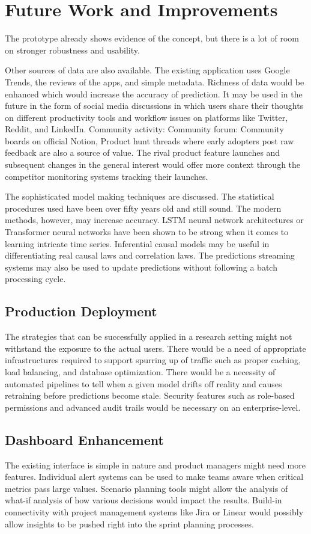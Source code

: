 \section{Future Work and Improvements}

The prototype already shows evidence of the concept, but there is a lot of room on stronger robustness and usability.

Other sources of data are also available.
The existing application uses Google Trends, the reviews of the apps, and simple metadata. Richness of data would be enhanced which would increase the accuracy of prediction. It may be used in the future in the form of social media discussions in which users share their thoughts on different productivity tools and workflow issues on platforms like Twitter, Reddit, and LinkedIn. Community activity: Community forum: Community boards on official Notion, Product hunt threads where early adopters post raw feedback are also a source of value. The rival product feature launches and subsequent changes in the general interest would offer more context through the competitor monitoring systems tracking their launches.

The sophisticated model making techniques are discussed.
The statistical procedures used have been over fifty years old and still sound. The modern methods, however, may increase accuracy. LSTM neural network architectures or Transformer neural networks have been shown to be strong when it comes to learning intricate time series. Inferential causal models may be useful in differentiating real causal laws and correlation laws. The predictions streaming systems may also be used to update predictions without following a batch processing cycle.

\subsection{Production Deployment}
The strategies that can be successfully applied in a research setting might not withstand the exposure to the actual users. There would be a need of appropriate infrastructures required to support spurring up of traffic such as proper caching, load balancing, and database optimization. There would be a necessity of automated pipelines to tell when a given model drifts off reality and causes retraining before predictions become stale. Security features such as role-based permissions and advanced audit trails would be necessary on an enterprise-level.

\subsection{Dashboard Enhancement}
The existing interface is simple in nature and product managers might need more features. Individual alert systems can be used to make teams aware when critical metrics pass large values. Scenario planning tools might allow the analysis of what-if analysis of how various decisions would impact the results. Build-in connectivity with project management systems like Jira or Linear would possibly allow insights to be pushed right into the sprint planning processes.


